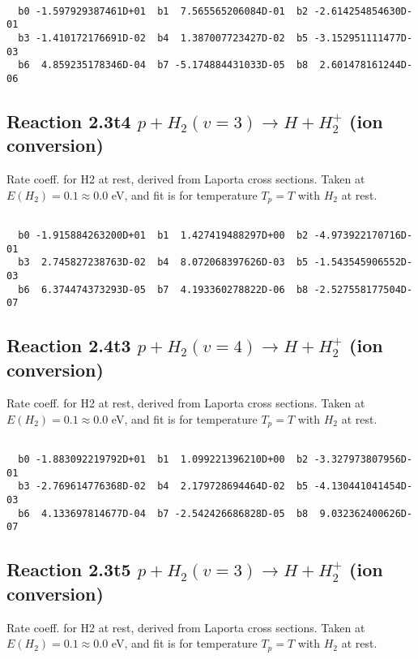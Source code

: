 \begin{small}\begin{verbatim}

  b0 -1.597929387461D+01  b1  7.565565206084D-01  b2 -2.614254854630D-01
  b3 -1.410172176691D-02  b4  1.387007723427D-02  b5 -3.152951111477D-03
  b6  4.859235178346D-04  b7 -5.174884431033D-05  b8  2.601478161244D-06

\end{verbatim}\end{small}

\newpage
\subsection{
Reaction 2.3t4
$ p + H_2(v=3) \rightarrow H + H_2^+$ (ion conversion)
}
Rate coeff. for H2 at rest, derived from Laporta cross sections.
Taken at $E(H_2) = 0.1 \approx 0.0$ eV,  and fit is for temperature $T_p=T$ with $H_2$ at rest.

\begin{small}\begin{verbatim}

  b0 -1.915884263200D+01  b1  1.427419488297D+00  b2 -4.973922170716D-01
  b3  2.745827238763D-02  b4  8.072068397626D-03  b5 -1.543545906552D-03
  b6  6.374474373293D-05  b7  4.193360278822D-06  b8 -2.527558177504D-07

\end{verbatim}\end{small}

\newpage
\subsection{
Reaction 2.4t3
$ p + H_2(v=4) \rightarrow H + H_2^+$ (ion conversion)
}
Rate coeff. for H2 at rest, derived from Laporta cross sections.
Taken at $E(H_2) = 0.1 \approx 0.0$ eV,  and fit is for temperature $T_p=T$ with $H_2$ at rest.

\begin{small}\begin{verbatim}

  b0 -1.883092219792D+01  b1  1.099221396210D+00  b2 -3.327973807956D-01
  b3 -2.769614776368D-02  b4  2.179728694464D-02  b5 -4.130441041454D-03
  b6  4.133697814677D-04  b7 -2.542426686828D-05  b8  9.032362400626D-07

\end{verbatim}\end{small}

\newpage
\subsection{
Reaction 2.3t5
$ p + H_2(v=3) \rightarrow H + H_2^+$ (ion conversion)
}
Rate coeff. for H2 at rest, derived from Laporta cross sections.
Taken at $E(H_2) = 0.1 \approx 0.0$ eV,  and fit is for temperature $T_p=T$ with $H_2$ at rest.

